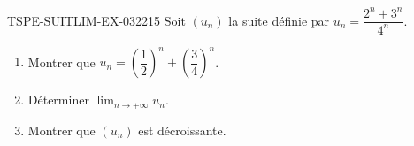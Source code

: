 \begin{exercice}{TSPE-SUITLIM-EX-032}{2}{15}
Soit $(u_n)$ la suite définie par $u_n = \dfrac{2^n + 3^n}{4^n}$.
\begin{enumerate}
  \item Montrer que $u_n = \left(\dfrac{1}{2}\right)^n + \left(\dfrac{3}{4}\right)^n$.
  \item Déterminer $\lim_{n \to +\infty} u_n$.
  \item Montrer que $(u_n)$ est décroissante.
\end{enumerate}
\end{exercice}
